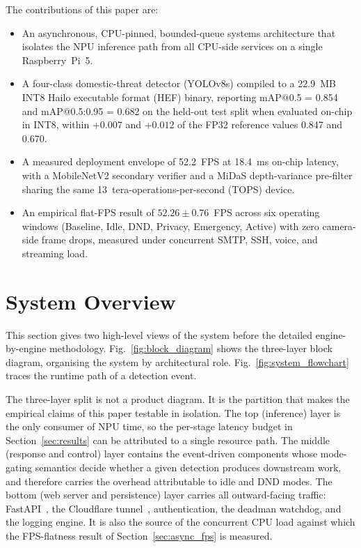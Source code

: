 \documentclass{ieeeaccess}
\begin{document}
The contributions of this paper are:
\begin{itemize}
\item An asynchronous, CPU-pinned, bounded-queue systems architecture that isolates the NPU inference path from all CPU-side services on a single Raspberry~Pi~5.
\item A four-class domestic-threat detector (YOLOv8s) compiled to a 22.9~MB INT8 Hailo executable format (HEF) binary, reporting mAP@0.5 = 0.854 and mAP@0.5:0.95 = 0.682 on the held-out test split when evaluated on-chip in INT8, within $+0.007$ and $+0.012$ of the FP32 reference values 0.847 and 0.670.
\item A measured deployment envelope of 52.2~FPS at 18.4~ms on-chip latency, with a MobileNetV2 secondary verifier and a MiDaS depth-variance pre-filter sharing the same 13~tera-operations-per-second (TOPS) device.
\item An empirical flat-FPS result of $52.26 \pm 0.76$~FPS across six operating windows (Baseline, Idle, DND, Privacy, Emergency, Active) with zero camera-side frame drops, measured under concurrent SMTP, SSH, voice, and streaming load.
\end{itemize}

\section{System Overview}
\label{sec:overview}
This section gives two high-level views of the system before the detailed engine-by-engine methodology. Fig.~\ref{fig:block_diagram} shows the three-layer block diagram, organising the system by architectural role. Fig.~\ref{fig:system_flowchart} traces the runtime path of a detection event.

The three-layer split is not a product diagram. It is the partition that makes the empirical claims of this paper testable in isolation. The top (inference) layer is the only consumer of NPU time, so the per-stage latency budget in Section~\ref{sec:results} can be attributed to a single resource path. The middle (response and control) layer contains the event-driven components whose mode-gating semantics decide whether a given detection produces downstream work, and therefore carries the overhead attributable to idle and DND modes. The bottom (web server and persistence) layer carries all outward-facing traffic: FastAPI~\cite{b12}, the Cloudflare tunnel~\cite{b17}, authentication, the deadman watchdog, and the logging engine. It is also the source of the concurrent CPU load against which the FPS-flatness result of Section~\ref{sec:async_fps} is measured.
\end{document}
